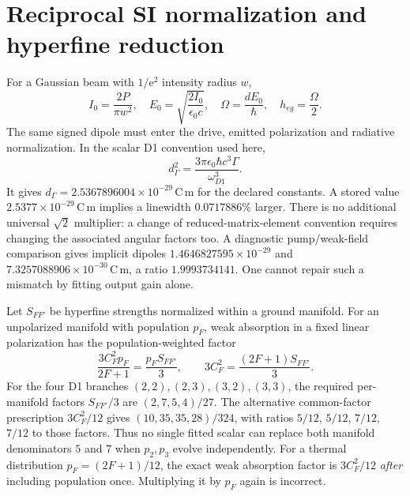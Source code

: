 \documentclass[11pt,a4paper]{article}
\newcommand{\e}{\mathrm e}
\begin{document}
\section{Reciprocal SI normalization and hyperfine reduction}
\label{sec:gc-normalization}

For a Gaussian beam with $1/\e^2$ intensity radius $w$,
\begin{equation}
 I_0=\frac{2P}{\pi w^2},\quad
 E_0=\sqrt{\frac{2I_0}{\epsilon_0c}},\quad
 \Omega=\frac{dE_0}{\hbar},\quad h_{eg}=\frac{\Omega}{2}.
 \label{eq:gc-si-drive}
\end{equation}
The same signed dipole must enter the drive, emitted polarization and
radiative normalization. In the scalar D1 convention used here,
\begin{equation}
 d_\Gamma^2=\frac{3\pi\epsilon_0\hbar c^3\Gamma}{\omega_{D1}^3}.
 \label{eq:gc-dipole-linewidth}
\end{equation}
It gives $d_\Gamma=2.5367896004\times10^{-29}\,\mathrm{C\,m}$ for the
declared constants. A stored value $2.5377\times10^{-29}\,\mathrm{C\,m}$
implies a linewidth $0.0717886\%$ larger. There is no additional universal
$\sqrt2$ multiplier: a change of reduced-matrix-element convention requires
changing the associated angular factors too. A diagnostic pump/weak-field
comparison gives implicit dipoles $1.4646827595\times10^{-29}$ and
$7.3257088906\times10^{-30}\,\mathrm{C\,m}$, a ratio $1.9993734141$.
One cannot repair such a mismatch by fitting output gain alone.

Let $S_{FF'}$ be hyperfine strengths normalized within a ground manifold.
For an unpolarized manifold with population $p_F$, weak absorption in a fixed
linear polarization has the population-weighted factor
\begin{equation}
 \frac{3C_F^2p_F}{2F+1}=\frac{p_FS_{FF'}}{3},
 \qquad 3C_F^2=\frac{(2F+1)S_{FF'}}{3}.
 \label{eq:gc-manifold-strength}
\end{equation}
For the four D1 branches $(2,2),(2,3),(3,2),(3,3)$, the required per-manifold
factors $S_{FF'}/3$ are $(2,7,5,4)/27$. The alternative common-factor
prescription $3C_F^2/12$ gives $(10,35,35,28)/324$, with ratios $5/12$,
$5/12$, $7/12$, $7/12$ to those factors. Thus no single fitted scalar can
replace both manifold denominators $5$ and $7$ when $p_2,p_3$ evolve
independently. For a thermal distribution $p_F=(2F+1)/12$, the exact weak
absorption factor is $3C_F^2/12$ \emph{after} including population once.
Multiplying it by $p_F$ again is incorrect.
\end{document}
